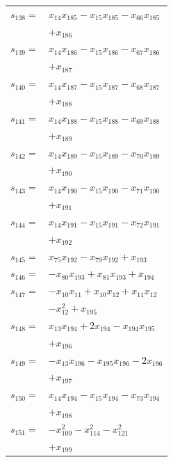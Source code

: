 \begin{longtable}{@{}r@{\;}l@{}}
\(s_{138}=\) & \(\displaystyle x_{14}x_{185} -x_{15}x_{185} -x_{66}x_{185}\) \\
 & \(\displaystyle +x_{186}\) \\[3pt]
\(s_{139}=\) & \(\displaystyle x_{14}x_{186} -x_{15}x_{186} -x_{67}x_{186}\) \\
 & \(\displaystyle +x_{187}\) \\[3pt]
\(s_{140}=\) & \(\displaystyle x_{14}x_{187} -x_{15}x_{187} -x_{68}x_{187}\) \\
 & \(\displaystyle +x_{188}\) \\[3pt]
\(s_{141}=\) & \(\displaystyle x_{14}x_{188} -x_{15}x_{188} -x_{69}x_{188}\) \\
 & \(\displaystyle +x_{189}\) \\[3pt]
\(s_{142}=\) & \(\displaystyle x_{14}x_{189} -x_{15}x_{189} -x_{70}x_{189}\) \\
 & \(\displaystyle +x_{190}\) \\[3pt]
\(s_{143}=\) & \(\displaystyle x_{14}x_{190} -x_{15}x_{190} -x_{71}x_{190}\) \\
 & \(\displaystyle +x_{191}\) \\[3pt]
\(s_{144}=\) & \(\displaystyle x_{14}x_{191} -x_{15}x_{191} -x_{72}x_{191}\) \\
 & \(\displaystyle +x_{192}\) \\[3pt]
\(s_{145}=\) & \(\displaystyle x_{75}x_{192} -x_{79}x_{192} +x_{193}\) \\[3pt]
\(s_{146}=\) & \(\displaystyle -x_{80}x_{193} +x_{81}x_{193} +x_{194}\) \\[3pt]
\(s_{147}=\) & \(\displaystyle -x_{10}x_{11} +x_{10}x_{12} +x_{11}x_{12}\) \\
 & \(\displaystyle -x_{12}^{2} +x_{195}\) \\[3pt]
\(s_{148}=\) & \(\displaystyle x_{13}x_{194} +2x_{194} -x_{194}x_{195}\) \\
 & \(\displaystyle +x_{196}\) \\[3pt]
\(s_{149}=\) & \(\displaystyle -x_{13}x_{196} -x_{195}x_{196} -2x_{196}\) \\
 & \(\displaystyle +x_{197}\) \\[3pt]
\(s_{150}=\) & \(\displaystyle x_{14}x_{194} -x_{15}x_{194} -x_{73}x_{194}\) \\
 & \(\displaystyle +x_{198}\) \\[3pt]
\(s_{151}=\) & \(\displaystyle -x_{109}^{2} -x_{114}^{2} -x_{121}^{2}\) \\
 & \(\displaystyle +x_{199}\) \\[3pt]

\end{longtable}
